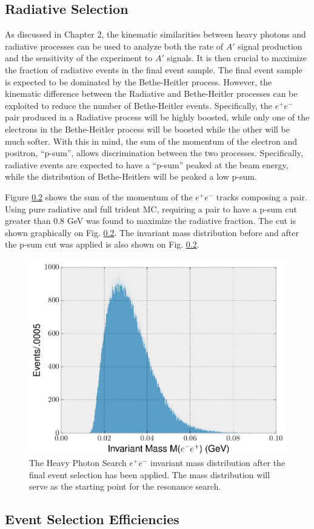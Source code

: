 
\subsection{Radiative Selection}

As discussed in Chapter 2, the kinematic similarities between heavy photons and
radiative processes can be used to analyze both the rate of $A'$ signal production
and the sensitivity of the experiment to $A'$ signals.  It is then crucial to
maximize the fraction of radiative events in the final event sample.  The final
event sample is expected to be dominated by the Bethe-Heitler process.  However,
the kinematic difference between the Radiative and Bethe-Heitler processes can 
be exploited to reduce the number of Bethe-Heitler events.  Specifically, the 
$e^+e^-$ pair produced in a Radiative process will be highly boosted, while 
only one of the electrons in the Bethe-Heitler process will be boosted 
while the other will be much softer.  With this in mind, the sum of the momentum
of the electron and positron, ``p-sum'', allows discrimination between the two processes.
Specifically, radiative events are expected to have a ``p-sum'' peaked 
at the beam energy, while the distribution of Bethe-Heitlers will be peaked a 
low p-sum.

Figure \ref{} shows the sum of the momentum of the $e^+e^-$ tracks composing a 
pair. Using pure radiative and full trident MC, requiring a pair to have a 
p-sum cut greater than 0.8 GeV was found to maximize the radiative fraction.
The cut is shown graphically on Fig. \ref{}.  The invariant mass distribution
before and after the p-sum cut was applied is also shown on Fig. \ref{}.

\begin{figure}[t]
    \centering
    \includegraphics[width=1.0\textwidth]{images/invariant_mass_final.png}
    \caption{The Heavy Photon Search $e^+e^-$ invariant mass distribution after
             the final event selection has been applied.  The mass distribution
             will serve as the starting point for the resonance search.}
    \label{fig:mass_distribution}
\end{figure}

\subsection{Event Selection Efficiencies}
